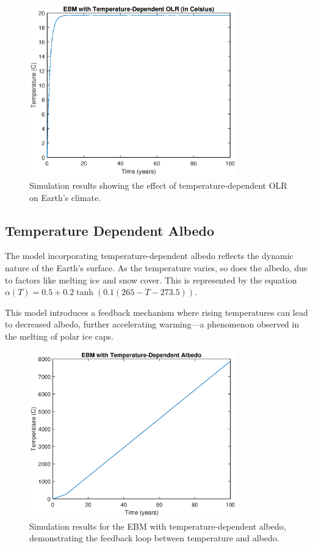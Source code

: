 \documentclass[12pt]{article}
\begin{document}
\begin{figure}[ht]
\centering
\includegraphics[width=0.8\textwidth]{images/temperature_dependent_OLR.eps}
\caption{Simulation results showing the effect of temperature-dependent OLR on Earth's climate.}
\label{fig:tempDepOLR}
\end{figure}

\subsection{Temperature Dependent Albedo}
The model incorporating temperature-dependent albedo 
reflects the dynamic nature of the Earth's surface. 
As the temperature varies, so does the albedo, 
due to factors like melting ice and snow cover. 
This is represented by the equation 
\( \alpha(T) = 0.5 + 0.2 \tanh(0.1(265 - T - 273.5)) \).

This model introduces a feedback mechanism 
where rising temperatures can lead to decreased albedo, 
further accelerating warming—a phenomenon observed 
in the melting of polar ice caps. 

\begin{figure}[ht]
\centering
\includegraphics[width=0.8\textwidth]{images/temperature_dependent_albedo.eps}
\caption{Simulation results for the EBM with temperature-dependent albedo, demonstrating the feedback loop between temperature and albedo.}
\label{fig:tempDepAlbedo}
\end{figure}
\end{document}
